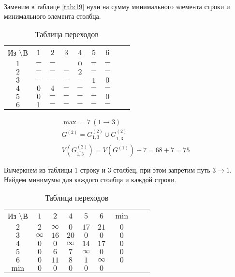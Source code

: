 Заменим в таблице \ref{tab:19} нули на сумму минимального элемента строки и минимального элемента столбца.

\begin{table}[H]
\begin{center}
	\def\tabcolsep{15pt}
	\caption{Таблица переходов}
	\label{tab:20}
	\begin{tabular}{|c||c|c|c|c|c|c|c|c|}
		\hline
		Из \textbackslash В & $1$ & $2$ & $3$ & $4$ & $5$ & $6$ \\
		\hhline{|=#=|=|=|=|=|=|}
		$1$ & $-$ & $-$ & \redbold{$7$} & $0$ & $-$ & $-$ \\
		\hline
		$2$ & $-$ & $-$ & $-$ & $2$ & $-$ & $-$ \\
		\hline
		$3$ & $-$ & $-$ & $-$ & $-$ & $1$ & $0$ \\ 
		\hline
		$4$ & $0$ & $4$ & $-$ & $-$ & $-$ & $-$ \\
		\hline
		$5$ & $0$ & $-$ & $-$ & $-$ & $-$ & $0$ \\
		\hline
		$6$ & $1$ & $-$ & $-$ & $-$ & $-$ & $-$ \\ 
		\hline
	\end{tabular}
\end{center}
\end{table}

\vspace{-1cm}
\begin{gather*}
\max = 7\ (1 \rightarrow 3) \\
G^{(2)} = G_{1,3}^{(2)} \cup G_{\overline{1,3}}^{(2)} \\
V(G_{\overline{1,3}}^{(2)}) = V(G^{(1)}) + 7 = 68 + 7 = 75
\end{gather*}

Вычеркнем из таблицы $1$ строку и $3$ столбец, при этом запретим путь $3 \rightarrow 1$. Найдем минимумы для каждого столбца и каждой строки.

\begin{table}[H]
\begin{center}
	\def\tabcolsep{15pt}
	\caption{Таблица переходов}
	\label{tab:21}
	\begin{tabular}{|c||c|c|c|c|c|c|c|c|}
		\hline
		Из \textbackslash В & $1$ & $2$ & $4$ & $5$ & $6$ & $\min$ \\
		\hhline{|=#=|=|=|=|=|=|}
		\hline
		$2$ & $2$ & $\infty$ & $0$ & $17$ & $21$ & $0$ \\
		\hline
		$3$ & $\infty$ & $16$ & $20$ & $0$ & $0$ & $0$  \\ 
		\hline
		$4$ & $0$ & $0$ & $\infty$ & $14$ & $17$ & $0$  \\
		\hline
		$5$ & $0$ & $6$ & $7$ & $\infty$ & $0$ & $0$  \\
		\hline
		$6$ & $0$ & $11$ & $8$ & $1$ & $\infty$ & $0$  \\ 
		\hhline{|=#=|=|=|=|=|=|}
		$\min$ & $0$ & $0$ & $0$ & $0$ & $0$ & \\
		\hline 
	\end{tabular}
\end{center}
\end{table}

